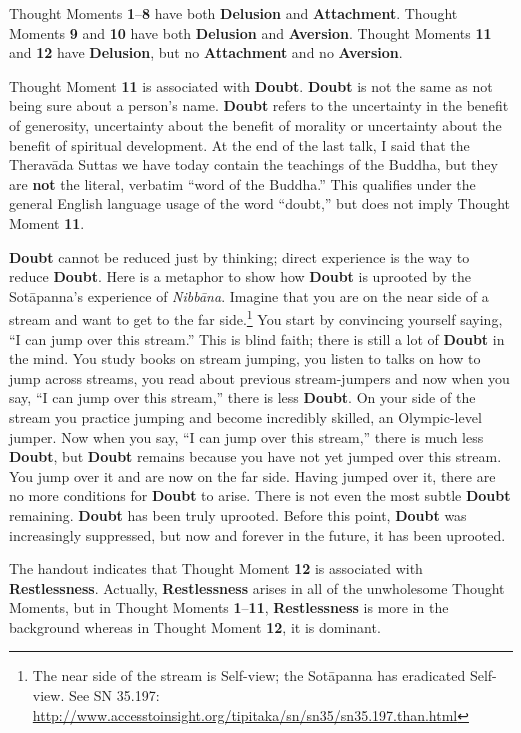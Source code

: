 Thought Moments \textbf{1}--\textbf{8} have both \textbf{Delusion} and \textbf{Attachment}. Thought Moments \textbf{9} and \textbf{10} have both \textbf{Delusion} and \textbf{Aversion}. Thought Moments \textbf{11} and \textbf{12} have \textbf{Delusion}, but no \textbf{Attachment} and no \textbf{Aversion}.

Thought Moment \textbf{11} is associated with \textbf{Doubt}. \textbf{Doubt} is not the same as not being sure about a person’s name. \textbf{Doubt} refers to the uncertainty in the benefit of generosity, uncertainty about the benefit of morality or uncertainty about the benefit of spiritual development. At the end of the last talk, I said that the Theravāda Suttas we have today contain the teachings of the Buddha, but they are \textbf{not} the literal, verbatim “word of the Buddha.” This qualifies under the general English language usage of the word “doubt,” but does not imply Thought Moment \textbf{11}.

\textbf{Doubt} cannot be reduced just by thinking; direct experience is the way to reduce \textbf{Doubt}. Here is a metaphor to show how \textbf{Doubt} is uprooted by the Sotāpanna’s experience of \textit{Nibbāna}. Imagine that you are on the near side of a stream and want to get to the far side.\footnote{The near side of the stream is Self-view; the Sotāpanna has eradicated Self-view. See SN 35.197: \url{http://www.accesstoinsight.org/tipitaka/sn/sn35/sn35.197.than.html}} You start by convincing yourself saying, “I can jump over this stream.” This is blind faith; there is still a lot of \textbf{Doubt} in the mind. You study books on stream jumping, you listen to talks on how to jump across streams, you read about previous stream-jumpers and now when you say, “I can jump over this stream,” there is less \textbf{Doubt}. On your side of the stream you practice jumping and become incredibly skilled, an Olympic-level jumper. Now when you say, “I can jump over this stream,” there is much less \textbf{Doubt}, but \textbf{Doubt} remains because you have not yet jumped over this stream. You jump over it and are now on the far side. Having jumped over it, there are no more conditions for \textbf{Doubt} to arise. There is not even the most subtle \textbf{Doubt} remaining. \textbf{Doubt} has been truly uprooted. Before this point, \textbf{Doubt} was increasingly suppressed, but now and forever in the future, it has been uprooted.

The handout indicates that Thought Moment \textbf{12} is associated with \textbf{Restlessness}. Actually, \textbf{Restlessness} arises in all of the unwholesome Thought Moments, but in Thought Moments \textbf{1}--\textbf{11}, \textbf{Restlessness} is more in the background whereas in Thought Moment \textbf{12}, it is dominant.


